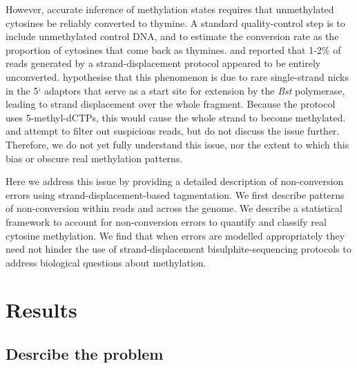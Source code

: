 \documentclass[12pt,longbibliography]{article}
\begin{document}
However, accurate inference of methylation states requires that unmethylated cytosines be reliably converted to thymine.
A standard quality-control step is to include unmethylated control DNA, and to estimate the conversion rate as the proportion of cytosines that come back as thymines.
\textcite{lu2015improved} and \textcite{suzuki2018whole} reported that 1-2\% of reads generated by a strand-displacement protocol appeared to be entirely unconverted.
\textcite{lu2015improved} hypothesise that this phenomenon is due to rare single-strand nicks in the 5` adaptors that serve as a start site for extension by the \textit{Bst} polymerase, leading to strand displacement over the whole fragment.
Because the protocol uses 5-methyl-dCTPs, this would cause the whole strand to become methylated.
\textcite{lu2015improved} and \textcite{suzuki2018whole} attempt to filter out suspicious reads, but do not discuss the issue further.
Therefore, we do not yet fully understand this issue, nor the extent to which this bias or obscure real methylation patterns.

Here we address this issue by providing a detailed description of non-conversion errors using strand-displacement-based tagmentation.
We first describe patterns of non-conversion within reads and across the genome.
We describe a statistical framework to account for non-conversion errors to quantify and classify real cytosine methylation.
We find that when errors are modelled appropriately they need not hinder the use of strand-displacement bisulphite-sequencing protocols to address biological questions about methylation.

\section{Results}

\subsection{Desrcibe the problem}
\end{document}
